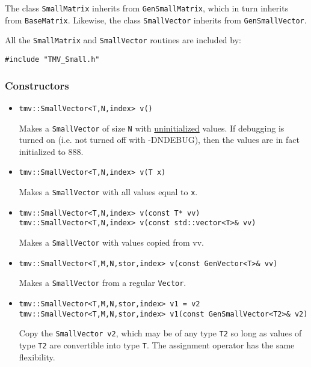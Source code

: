 \documentclass[twoside,letterpaper,11pt]{article}
\renewcommand{\tt}[1]{{\texttt {#1}}}
\begin{document}
The class \tt{SmallMatrix} inherits from \tt{GenSmallMatrix},
which in turn inherits from \tt{BaseMatrix}.
Likewise, the class \tt{SmallVector} inherits from \tt{GenSmallVector}.

All the \tt{SmallMatrix} and \tt{SmallVector} routines are included by:
\begin{verbatim}
#include "TMV_Small.h"
\end{verbatim}

\subsubsection{Constructors}

\begin{itemize}
\item 
\begin{verbatim}
tmv::SmallVector<T,N,index> v()
\end{verbatim}
Makes a \tt{SmallVector} of size \tt{N}
with \underline{uninitialized} values.
If debugging is turned on (i.e. not turned off
with -DNDEBUG), then the values are in fact initialized to 888. 

\item
\begin{verbatim}
tmv::SmallVector<T,N,index> v(T x)
\end{verbatim}
Makes a \tt{SmallVector} with all values equal to \tt{x}.

\item
\begin{verbatim}
tmv::SmallVector<T,N,index> v(const T* vv)
tmv::SmallVector<T,N,index> v(const std::vector<T>& vv)
\end{verbatim}
Makes a \tt{SmallVector} with values copied from vv.

\item 
\begin{verbatim}
tmv::SmallVector<T,M,N,stor,index> v(const GenVector<T>& vv)
\end{verbatim}
Makes a \tt{SmallVector} from a regular \tt{Vector}.

\item
\begin{verbatim}
tmv::SmallVector<T,M,N,stor,index> v1 = v2
tmv::SmallVector<T,M,N,stor,index> v1(const GenSmallVector<T2>& v2)
\end{verbatim}
Copy the \tt{SmallVector v2}, which may be of any type \tt{T2} so long
as values of type \tt{T2} are convertible into type \tt{T}.
The assignment operator has the same flexibility.


\end{itemize}
\end{document}
